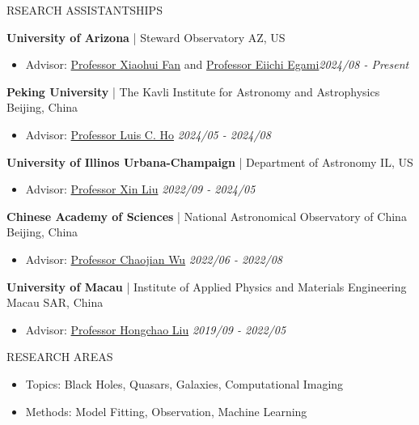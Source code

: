 \documentclass[11pt]{article} %
\begin{document}
\begin{section}{RSEARCH ASSISTANTSHIPS}

\textbf{University of Arizona} | Steward Observatory \hfill AZ, US 
\begin{itemize}[leftmargin=1.5em]
\item Advisor: \href{mailto:xfan@arizona.edu}{Professor Xiaohui Fan} and \href{mailto:egami@arizona.edu}{Professor Eiichi Egami}\hfill \textit{2024/08 - Present}
\end{itemize}

\textbf{Peking University} | The Kavli Institute for Astronomy and Astrophysics \hfill Beijing, China 
\begin{itemize}[leftmargin=1.5em]
\item Advisor: \href{mailto:lho.pku@gmail.com}{Professor Luis C. Ho} \hfill \textit{2024/05 - 2024/08}
\end{itemize}

\textbf{University of Illinos Urbana-Champaign} | Department of Astronomy \hfill IL, US 
\begin{itemize}[leftmargin=1.5em]
\item Advisor: \href{mailto:xinliuxl@illinois.edu}{Professor Xin Liu} \hfill \textit{2022/09 - 2024/05}
\end{itemize}

\textbf{Chinese Academy of Sciences} | National Astronomical Observatory of China \hfill Beijing, China 
\begin{itemize}[leftmargin=1.5em]
\item Advisor: \href{mailto:chjwu@bao.ac.cn}{Professor Chaojian Wu} \hfill \textit{2022/06 - 2022/08} 
\end{itemize}

\textbf{University of Macau} | Institute of Applied Physics and Materials Engineering \hfill Macau SAR, China
\begin{itemize}[leftmargin=1.5em]
\item Advisor: \href{mailto:hcliu@um.edu.mo}{Professor Hongchao Liu} \hfill \textit{2019/09 - 2022/05}
\end{itemize}

\end{section}

\begin{section}{RESEARCH AREAS}

\begin{itemize}[leftmargin=1.5em]
    \item Topics: Black Holes, Quasars, Galaxies, Computational Imaging
    \item Methods: Model Fitting, Observation, Machine Learning 
\end{itemize}

\end{section}
\end{document}
